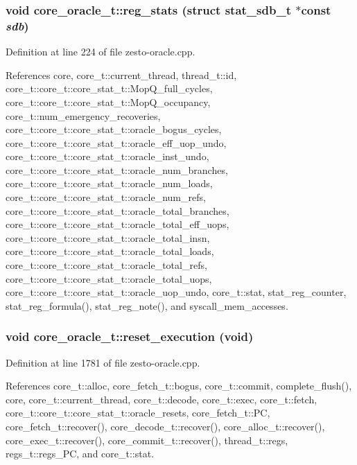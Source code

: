 \subsubsection[{reg\_\-stats}]{\setlength{\rightskip}{0pt plus 5cm}void core\_\-oracle\_\-t::reg\_\-stats (struct {\bf stat\_\-sdb\_\-t} $\ast$const  {\em sdb})}\label{classcore__oracle__t_7d71b6dc91df7d7d00820e3aea46f576}




Definition at line 224 of file zesto-oracle.cpp.

References core, core\_\-t::current\_\-thread, thread\_\-t::id, core\_\-t::core\_\-t::core\_\-stat\_\-t::MopQ\_\-full\_\-cycles, core\_\-t::core\_\-t::core\_\-stat\_\-t::MopQ\_\-occupancy, core\_\-t::num\_\-emergency\_\-recoveries, core\_\-t::core\_\-t::core\_\-stat\_\-t::oracle\_\-bogus\_\-cycles, core\_\-t::core\_\-t::core\_\-stat\_\-t::oracle\_\-eff\_\-uop\_\-undo, core\_\-t::core\_\-t::core\_\-stat\_\-t::oracle\_\-inst\_\-undo, core\_\-t::core\_\-t::core\_\-stat\_\-t::oracle\_\-num\_\-branches, core\_\-t::core\_\-t::core\_\-stat\_\-t::oracle\_\-num\_\-loads, core\_\-t::core\_\-t::core\_\-stat\_\-t::oracle\_\-num\_\-refs, core\_\-t::core\_\-t::core\_\-stat\_\-t::oracle\_\-total\_\-branches, core\_\-t::core\_\-t::core\_\-stat\_\-t::oracle\_\-total\_\-eff\_\-uops, core\_\-t::core\_\-t::core\_\-stat\_\-t::oracle\_\-total\_\-insn, core\_\-t::core\_\-t::core\_\-stat\_\-t::oracle\_\-total\_\-loads, core\_\-t::core\_\-t::core\_\-stat\_\-t::oracle\_\-total\_\-refs, core\_\-t::core\_\-t::core\_\-stat\_\-t::oracle\_\-total\_\-uops, core\_\-t::core\_\-t::core\_\-stat\_\-t::oracle\_\-uop\_\-undo, core\_\-t::stat, stat\_\-reg\_\-counter, stat\_\-reg\_\-formula(), stat\_\-reg\_\-note(), and syscall\_\-mem\_\-accesses.
\subsubsection[{reset\_\-execution}]{\setlength{\rightskip}{0pt plus 5cm}void core\_\-oracle\_\-t::reset\_\-execution (void)}\label{classcore__oracle__t_cd307b32aa377a56b3f4dc79b2122038}




Definition at line 1781 of file zesto-oracle.cpp.

References core\_\-t::alloc, core\_\-fetch\_\-t::bogus, core\_\-t::commit, complete\_\-flush(), core, core\_\-t::current\_\-thread, core\_\-t::decode, core\_\-t::exec, core\_\-t::fetch, core\_\-t::core\_\-t::core\_\-stat\_\-t::oracle\_\-resets, core\_\-fetch\_\-t::PC, core\_\-fetch\_\-t::recover(), core\_\-decode\_\-t::recover(), core\_\-alloc\_\-t::recover(), core\_\-exec\_\-t::recover(), core\_\-commit\_\-t::recover(), thread\_\-t::regs, regs\_\-t::regs\_\-PC, and core\_\-t::stat.

